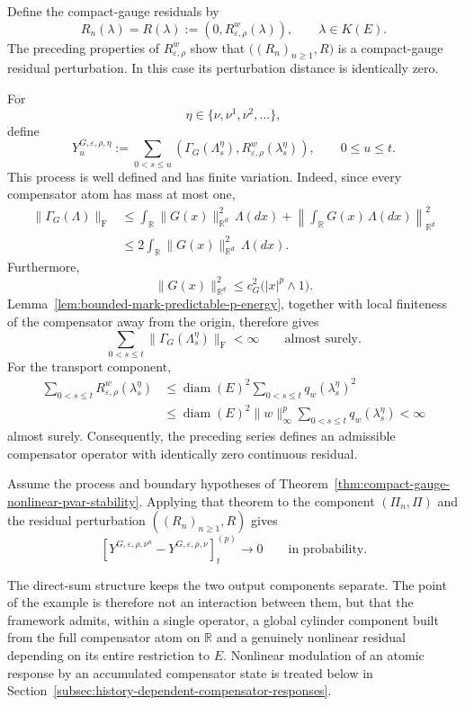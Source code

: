 \documentclass[a4paper,10pt]{article}
\begin{document}
Define the compact-gauge residuals by
\[
R_n(\lambda)
=
R(\lambda)
:=
\left(
        0,
        R_{\varepsilon,\rho}^w(\lambda)
\right),
\qquad \lambda\in K(E).
\]
The preceding properties of \(R_{\varepsilon,\rho}^w\) show that
$
        \bigl((R_n)_{n\ge1},R\bigr)
$
is a compact-gauge residual perturbation. In this case its perturbation
distance is identically zero.

For
\[
        \eta\in\{\nu,\nu^1,\nu^2,\ldots\},
\]
define
\[
Y_u^{G,\varepsilon,\rho,\eta}
:=
\sum_{0<s\le u}
\left(
        \Gamma_G(\Lambda_s^\eta),
        R_{\varepsilon,\rho}^w(\lambda_s^\eta)
\right),
\qquad 0\le u\le t.
\]
This process is well defined and has finite variation. Indeed, since
every compensator atom has mass at most one,
\[
\begin{aligned}
\lVert\Gamma_G(\Lambda)\rVert_{\mathrm F}
&\le
\int_{\mathbb R}
\lVert G(x)\rVert_{\mathbb R^d}^2\,\Lambda(dx)
+
\left\lVert
\int_{\mathbb R}G(x)\,\Lambda(dx)
\right\rVert_{\mathbb R^d}^2
\\
&\le
2
\int_{\mathbb R}
\lVert G(x)\rVert_{\mathbb R^d}^2\,\Lambda(dx).
\end{aligned}
\]
Furthermore,
\[
        \lVert G(x)\rVert_{\mathbb R^d}^2
        \le
        c_G^2\bigl(|x|^p\wedge1\bigr).
\]
Lemma~\ref{lem:bounded-mark-predictable-p-energy}, together with local
finiteness of the compensator away from the origin, therefore gives
\[
\sum_{0<s\le t}
\lVert\Gamma_G(\Lambda_s^\eta)\rVert_{\mathrm F}
<
\infty
\qquad\text{almost surely}.
\]
For the transport component,
\[
\begin{aligned}
\sum_{0<s\le t}
R_{\varepsilon,\rho}^w(\lambda_s^\eta)
&\le
\operatorname{diam}(E)^2
\sum_{0<s\le t}
q_w(\lambda_s^\eta)^2
\\
&\le
\operatorname{diam}(E)^2
\lVert w\rVert_\infty^p
\sum_{0<s\le t}
q_w(\lambda_s^\eta)
<
\infty
\end{aligned}
\]
almost surely. Consequently, the preceding series defines an
admissible compensator operator with identically zero continuous
residual.

Assume the process and boundary hypotheses of
Theorem~\ref{thm:compact-gauge-nonlinear-pvar-stability}. Applying that
theorem to the component \((\Pi_n,\Pi)\) and the residual perturbation
\(((R_n)_{n\ge1},R)\) gives
\[
\left[
Y^{G,\varepsilon,\rho,\nu^n}
-
Y^{G,\varepsilon,\rho,\nu}
\right]^{(p)}_t
\longrightarrow0
\qquad\text{in probability}.
\]

The direct-sum structure keeps the two output components separate.
The point of the example is therefore not an interaction between them,
but that the framework admits, within a single operator, a global
cylinder component built from the full compensator atom on
\(\mathbb R\) and a genuinely nonlinear residual depending on its
entire restriction to \(E\). Nonlinear modulation of an atomic
response by an accumulated compensator state is treated below in
Section~\ref{subsec:history-dependent-compensator-responses}.
\end{document}
